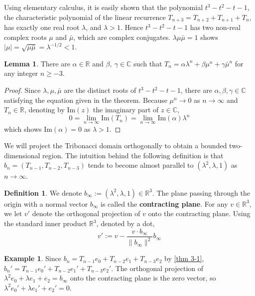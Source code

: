 \documentclass{article}
\theoremstyle{definition}
\newtheorem{lemma}[theorem]{Lemma}
\newtheorem*{definition}{Definition}
\newtheorem*{example}{Example}
\begin{document}
Using elementary calculus, it is easily shown that the polynomial $t^3-t^2-t-1$, the characteristic polynomial of the linear recurrence $T_{n+3}=T_{n+2}+T_{n+1}+T_n$, has exactly one real root $\lambda$, and $\lambda >1$. Hence $t^3-t^2-t-1$ has two non-real complex roots $\mu$ and $\bar\mu$, which are complex conjugates. $\lambda\mu\bar{\mu}=1$ shows $|\mu|=\sqrt{\mu\bar{\mu}}=\lambda^{-1/2}<1$. 

\begin{lemma}
\label{thm 8-0}
There are $\alpha\in\mathbb{R}$ and $\beta, \ \gamma\in \mathbb{C}$ such that $T_n=\alpha\lambda^n+\beta\mu^n+\gamma \bar{\mu}^n$ for any integer $n\geq -3$.
\end{lemma}
\begin{proof}
Since $\lambda, \mu, \bar{\mu}$ are the distinct roots of $t^3-t^2-t-1$, there are $\alpha, \beta, \gamma\in\mathbb{C}$ satisfying the equation given in the theorem. Because $\mu^n\rightarrow0$ as $n\rightarrow\infty$ and $ T_n\in\mathbb{R}$, denoting by $\text{Im}(z)$ the imaginary part of $z\in\mathbb{C}$,
 \[
0=\lim_{n\rightarrow\infty} \text{Im}(T_n)= \lim_{n\rightarrow\infty}\text{Im}(\alpha)\lambda^n
\]
which shows $\text{Im}(\alpha)=0$ as $\lambda>1$.
\end{proof}

We will project the Tribonacci domain orthogonally to obtain a bounded two-dimensional region. The intuition behind the following definition is that 
\(
b_n=(T_{n-1}, T_{n-2}, T_{n-3})
\)
tends to become almost parallel to $(\lambda^2, \lambda, 1)$ as $n\rightarrow \infty$.

\begin{definition}
We denote $b_\infty:=(\lambda^2, \lambda, 1)\in \mathbb{R}^3$. The plane passing through the origin with a normal vector $b_\infty$ is called the \textbf{contracting plane}. For any $v\in \mathbb{R}^3$, we let $v'$ denote the orthogonal projection of $v$ onto the contracting plane. Using the standard inner product $\mathbb{R}^3$, denoted by a dot, \[v':=v-\frac{v\cdot b_\infty}{\|b_\infty \|^2}b_\infty\] 
\end{definition}

\begin{example}
Since $b_n=T_{n-1}e_0+T_{n-2}e_1+T_{n-3}e_2$ by \cref{thm 3-1}, $b_n'=T_{n-1}e_0'+T_{n-2}e_1'+T_{n-3}e_2'$. The orthogonal projection of $\lambda^2e_0+\lambda e_1+e_2=b_\infty$ onto the contracting plane is the zero vector, so $\lambda^2e_0'+\lambda e_1'+e_2'=0$.
\end{example}
\end{document}
